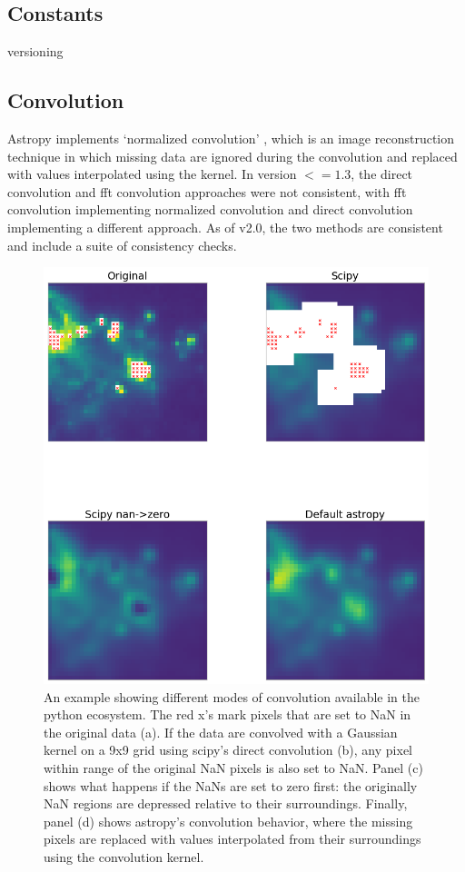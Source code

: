 \documentclass[modern]{aastex61}
\begin{document}
\subsection{Constants}
versioning

\subsection{Convolution}

Astropy implements `normalized convolution' \citep[e.g.,][]{Knutsson1993}, which is an image reconstruction technique in which missing data are ignored during the convolution and replaced with values interpolated using the kernel.   In version $<=1.3$, the direct convolution and fft convolution approaches were not consistent, with fft convolution implementing normalized convolution and direct convolution implementing a different approach.  As of v2.0, the two methods are consistent and include a suite of consistency checks.


\begin{figure}
\includegraphics[width=\textwidth]{convolution_example.png}
An example showing different modes of convolution available in the python ecosystem.  The red x's mark pixels that are set to NaN in the original data (a).  If the data are convolved with a Gaussian kernel on a 9x9 grid using scipy's direct convolution (b), any pixel within range of the original NaN pixels is also set to NaN.  Panel (c) shows what happens if the NaNs are set to zero first: the originally NaN regions are depressed relative to their surroundings.  Finally, panel (d) shows astropy's convolution behavior, where the missing pixels are replaced with values interpolated from their surroundings using the convolution kernel.
\end{figure}
\end{document}
